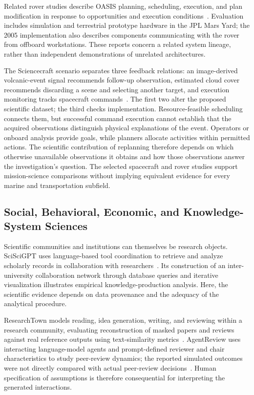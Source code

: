 Related rover studies describe OASIS planning, scheduling, execution, and plan modification in response to opportunities and execution conditions~\cite{asd0712,asd0733}. Evaluation includes simulation and terrestrial prototype hardware in the JPL Mars Yard; the 2005 implementation also describes components communicating with the rover from offboard workstations. These reports concern a related system lineage, rather than independent demonstrations of unrelated architectures.

The Sciencecraft scenario separates three feedback relations: an image-derived volcanic-event signal recommends follow-up observation, estimated cloud cover recommends discarding a scene and selecting another target, and execution monitoring tracks spacecraft commands~\cite{asd0645}. The first two alter the proposed scientific dataset; the third checks implementation. Resource-feasible scheduling connects them, but successful command execution cannot establish that the acquired observations distinguish physical explanations of the event. Operators or onboard analysis provide goals, while planners allocate activities within permitted actions. The scientific contribution of replanning therefore depends on which otherwise unavailable observations it obtains and how those observations answer the investigation's question. The selected spacecraft and rover studies support mission-science comparisons without implying equivalent evidence for every marine and transportation subfield.

\subsection{Social, Behavioral, Economic, and Knowledge-System Sciences}

Scientific communities and institutions can themselves be research objects. SciSciGPT uses language-based tool coordination to retrieve and analyze scholarly records in collaboration with researchers~\cite{asd0624}. Its construction of an inter-university collaboration network through database queries and iterative visualization illustrates empirical knowledge-production analysis. Here, the scientific evidence depends on data provenance and the adequacy of the analytical procedure.

ResearchTown models reading, idea generation, writing, and reviewing within a research community, evaluating reconstruction of masked papers and reviews against real reference outputs using text-similarity metrics~\cite{asd0652}. AgentReview uses interacting language-model agents and prompt-defined reviewer and chair characteristics to study peer-review dynamics; the reported simulated outcomes were not directly compared with actual peer-review decisions~\cite{asd0786}. Human specification of assumptions is therefore consequential for interpreting the generated interactions.

